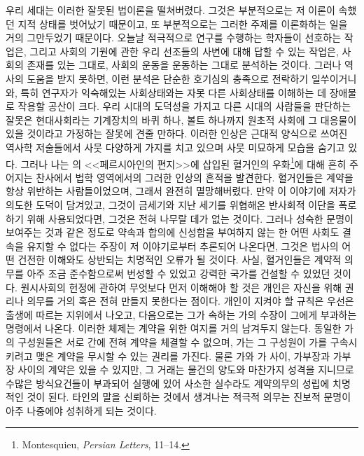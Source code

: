 우리 세대는 이러한 잘못된 법이론을 떨쳐버렸다.
그것은 부분적으로는 저 이론이 속했던 지적 상태를 벗어났기 때문이고,
또 부분적으로는 그러한 주제를 이론화하는 일을 거의 그만두었기 때문이다.
오늘날 적극적으로 연구를 수행하는 학자들이 선호하는 작업은,
그리고 사회의 기원에 관한 우리 선조들의 사변에 대해 답할 수 있는 작업은,
사회의 존재를 있는 그대로, 사회의 운동을 운동하는 그대로 분석하는 것이다.
그러나 역사의 도움을 받지 못하면,
이런 분석은 단순한 호기심의 충족으로 전락하기 일쑤이거니와,
특히
연구자가 익숙해있는 사회상태와는 자못 다른 사회상태를 이해하는 데
장애물로 작용할 공산이 크다.
우리 시대의 도덕성을 가지고 다른 시대의 사람들을 판단하는 잘못은
현대사회라는 기계장치의 바퀴 하나, 볼트 하나까지
원초적 사회에 그 대응물이 있을 것이라고 가정하는 잘못에 견줄 만하다.
이러한 인상은
근대적 양식으로 쓰여진 역사학 저술들에서
사뭇 다양하게 가지를 치고 있으며
사뭇 미묘하게 모습을 숨기고 있다.
그러나
나는
의
<<페르시아인의 편지>>에 삽입된
혈거인의 우화\footnote{%
  \latinmarks
  Montesquieu, \textit{Persian Letters}, 11--14.
}에 대해
흔히 주어지는 찬사에서
법학 영역에서의 그러한 인상의 흔적을 발견한다.
혈거인들은 계약을 항상 위반하는 사람들이었으며, 그래서 완전히 멸망해버렸다.
만약 이 이야기에 저자가 의도한 도덕이 담겨있고,
그것이
금세기와 지난 세기를 위협해온 반사회적 이단을
폭로하기 위해 사용되었다면,
그것은 전혀 나무랄 데가 없는 것이다.
그러나
성숙한 문명이 보여주는 것과 같은 정도로
약속과 합의에 신성함을 부여하지 않는 한
어떤 사회도 결속을 유지할 수 없다는
주장이
저 이야기로부터
추론되어 나온다면,
그것은 법사의 어떤 건전한 이해와도 상반되는 치명적인 오류가
될 것이다.
사실,
혈거인들은 계약적 의무를 아주 조금 준수함으로써
번성할 수 있었고 강력한 국가를 건설할 수 있었던 것이다.
원시사회의 헌정에 관하여
무엇보다 먼저 이해해야 할 것은
개인은 자신을 위해 권리나 의무를 거의 혹은 전혀 만들지 못한다는 점이다.
개인이 지켜야 할 규칙은 우선은 출생에 따르는 지위에서 나오고,
다음으로는 그가 속하는 가의 수장이 그에게 부과하는
명령에서 나온다.
이러한 체제는 계약을 위한 여지를 거의 남겨두지 않는다.
동일한 가의 구성원들은
서로 간에 전혀 계약을 체결할 수 없으며,
가는 그 구성원이 가를 구속시키려고 맺은 계약을
무시할 수 있는 권리를 가진다.
물론 가와 가 사이, 가부장과 가부장 사이의 계약은 있을 수 있지만,
그 거래는 물건의 양도와 마찬가지 성격을 지니므로
수많은 방식요건들이 부과되어
실행에 있어
사소한 실수라도 계약의무의 성립에 치명적인 것이 된다.
타인의 말을 신뢰하는 것에서 생겨나는 적극적 의무는
진보적 문명이 아주 나중에야 성취하게 되는 것이다.

